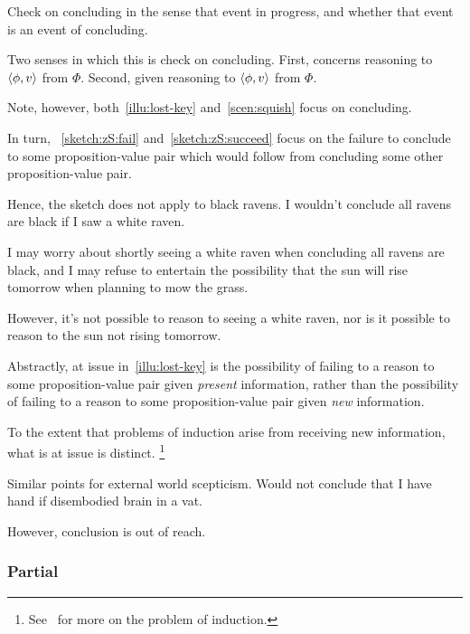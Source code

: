 \begin{note}
  Check on concluding in the sense that event in progress, and whether that event is an event of concluding.

  {
    \color{red}
    Two senses in which this is check on concluding.
    First, concerns reasoning to \(\langle \phi, v \rangle\) from \(\Phi\).
    Second, given reasoning to \(\langle \phi, v \rangle\) from \(\Phi\).
  }
\end{note}

\begin{note}
  Note, however, both~\autoref{illu:lost-key} and~\autoref{scen:squish} focus on concluding.

  In turn, ~\ref{sketch:zS:fail} and~\ref{sketch:zS:succeed} focus on the failure to conclude to some proposition-value pair which would follow from concluding some other proposition-value pair.

  Hence, the sketch does not apply to black ravens.
  I wouldn't conclude all ravens are black if I saw a white raven.

  I may worry about shortly seeing a white raven when concluding all ravens are black, and I may refuse to entertain the possibility that the sun will rise tomorrow when planning to mow the grass.

  However, it's not possible to reason to seeing a white raven, nor is it possible to reason to the sun not rising tomorrow.

  Abstractly, at issue in~\autoref{illu:lost-key} is the possibility of failing to a reason to some proposition-value pair given \emph{present} information, rather than the possibility of failing to a reason to some proposition-value pair given \emph{new} information.

  To the extent that problems of induction arise from receiving new information, what is at issue is distinct.%
  \footnote{
    See~\textcite{Henderson:2020wb} for more on the problem of induction.
  }

  Similar points for external world scepticism.
  Would not conclude that I have hand if disembodied brain in a vat.

  However, conclusion is out of reach.
\end{note}

\subsubsection{Partial}

